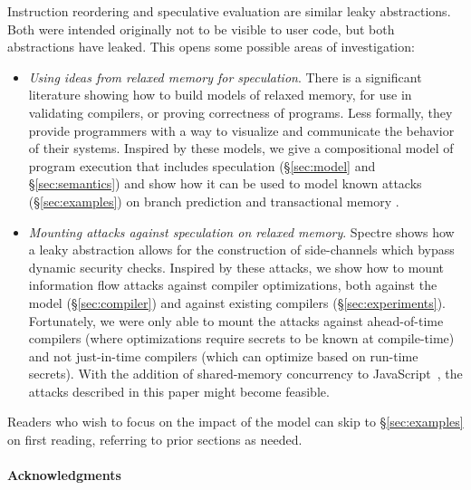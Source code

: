 \documentclass[conference]{IEEEtran}
\theoremstyle{plain}
\theoremstyle{definition}
\begin{document}
Instruction reordering and speculative evaluation are similar leaky abstractions.
Both were intended originally not to
be visible to user code, but both abstractions have leaked.
This opens some possible areas of investigation:
\begin{itemize}

\item \emph{Using ideas from relaxed memory for speculation}.  There is a
  significant literature showing how to build models of relaxed memory, for
  use in validating compilers, or proving correctness of programs.  Less
  formally, they provide programmers with a way to visualize and communicate
  the behavior of their systems.  Inspired by these models, we give a
  compositional model of program execution that includes speculation
  (\S\ref{sec:model} and \S\ref{sec:semantics}) and show how it can be used
  to model known attacks (\S\ref{sec:examples}) on branch prediction
  \cite{DBLP:journals/corr/abs-1801-01203} and transactional memory
  \cite{ChongSW18,DBLP:conf/uss/DisselkoenKPT17}.

\item \emph{Mounting attacks against speculation on relaxed memory}.
  Spectre shows how a leaky abstraction allows for the construction of
  side-channels which bypass dynamic security checks.
  Inspired by these
  attacks, we show how to mount information flow attacks against
  compiler optimizations, both against the model (\S\ref{sec:compiler})
  and against existing compilers (\S\ref{sec:experiments}).
  Fortunately, we were only able to mount the attacks against
  ahead-of-time compilers (where optimizations require secrets
  to be known at compile-time) and not just-in-time compilers
  (which can optimize based on run-time secrets).
  With the addition of shared-memory concurrency
  to JavaScript~\cite[\S24.2]{ecma-262}, the attacks described in this paper might
  become feasible.

\end{itemize}
Readers who wish to focus on the impact of the model can skip to \S\ref{sec:examples}
on first reading, referring to prior sections as needed.

\paragraph*{Acknowledgments}
\end{document}

